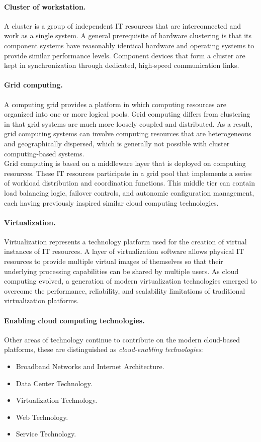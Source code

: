 \paragraph*{Cluster of workstation.} A cluster is a group of independent IT resources that are interconnected and work as a single system. A general prerequisite of hardware clustering is that its component systems have reasonably identical hardware and operating systems to provide similar performance levels. Component devices that form a cluster are kept in synchronization through dedicated, high-speed communication links.

\paragraph*{Grid computing.} A computing grid provides a platform in which computing
resources are organized into one or more logical pools. Grid computing differs from clustering in that grid systems are much more loosely coupled and distributed. As a result, grid computing systems can involve computing resources that are heterogeneous and geographically dispersed, which is generally not possible with cluster computing-based systems.\\
Grid computing is based on a middleware layer that is deployed on computing resources. These IT resources participate in a grid pool that implements a series of workload distribution and coordination functions. This middle tier can contain load balancing logic, failover controls, and autonomic configuration management, each having previously inspired similar cloud computing technologies. 

\paragraph*{Virtualization.} Virtualization represents a technology platform used for the creation of virtual instances of IT resources. A layer of virtualization software allows physical IT resources to provide multiple virtual images of themselves so that their underlying processing capabilities can be shared by multiple users. As cloud computing evolved, a generation of modern virtualization technologies emerged to overcome the performance, reliability, and scalability limitations of traditional virtualization platforms.

\paragraph*{Enabling cloud computing technologies.} Other areas of technology continue to contribute on the modern cloud-based platforms, these are distinguished as \textit{cloud-enabling technologies}:
\begin{itemize}
	\item Broadband Networks and Internet Architecture.
	\item Data Center Technology.
	\item Virtualization Technology.
	\item Web Technology.
	\item Service Technology.
\end{itemize}

